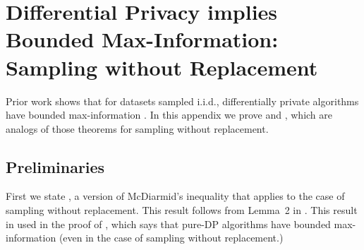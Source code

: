 \section{Differential Privacy implies Bounded Max-Information: Sampling without Replacement }\label{app:maxinfo}

Prior work shows that for datasets sampled i.i.d., differentially private algorithms have bounded max-information \cite{DworkFHPRR15,RogersRST16}. In this appendix we prove  and , which are analogs of those theorems for sampling without replacement.

\subsection{Preliminaries}\label{sec:prelims-appendix}

First we state , a version of McDiarmid's inequality that applies to the case of sampling without replacement. This result follows from Lemma~2 in \cite{Tolstikhin17}. This result in used in the proof of , which says that pure-DP algorithms have bounded max-information (even in the case of sampling without replacement.)




